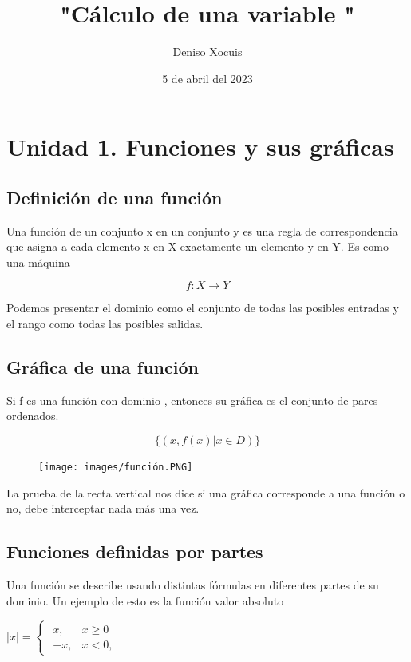 \documentclass[letterpaper,12pt]{article}
\title {\textbf{"Cálculo de una variable "}}
\author{Deniso Xocuis}
\date{5 de abril del 2023}
\begin{document}
\maketitle
\thispagestyle{empty}
\newpage
\setcounter{page}{1}
\pagestyle{headings}

\begin{sloppypar} 
\section{Unidad 1. Funciones y sus gráficas}
\subsection{Definición de una función}
Una función de un conjunto x en un conjunto y es una regla de correspondencia que asigna a cada elemento x en X exactamente un elemento y en Y. Es como una máquina

$$f : X \rightarrow Y$$

Podemos presentar el dominio como el conjunto de todas las posibles entradas y el rango como todas las posibles salidas.

\subsection{Gráfica de una función}
Si f es una función con dominio , entonces su gráfica es el conjunto de pares ordenados.

$$\{ (x,f(x) | x \in D)\} $$

\begin{figure}[H]
    \centering
    \texttt{[image: images/función.PNG]}
\end{figure}
La prueba de la recta vertical nos dice si una gráfica corresponde a una función o no, debe interceptar nada más una vez.

\subsection{Funciones definidas por partes}
Una función se describe usando distintas fórmulas en diferentes partes de su
dominio. Un ejemplo de esto es la función valor absoluto

\begin{center}
    $|x|= \left\lbrace\begin{array}{c} 
    \begin{matrix}
    x,  & x\geq 0 \\ 
    -x, & x<0 ,
    \end{matrix}
    \end{array}\right.$
\end{center}


\end{sloppypar}
\end{document}
